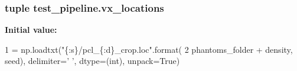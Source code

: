 \hypertarget{namespacetest__pipeline_a0891497d3339772fa64ecb2ef3816a8a}{
\subsubsection[{vx\-\_\-locations}]{\setlength{\rightskip}{0pt plus 5cm}tuple test\-\_\-pipeline.\-vx\-\_\-locations}}\label{namespacetest__pipeline_a0891497d3339772fa64ecb2ef3816a8a}
{\bfseries Initial value\-:}
\begin{DoxyCode}
1 = np.loadtxt(\textcolor{stringliteral}{"\{:s\}/pcl\_\{:d\}\_crop.loc"}.format(
2     phantoms\_folder + density, seed), delimiter=\textcolor{stringliteral}{' '}, dtype=(int), unpack=\textcolor{keyword}{True})
\end{DoxyCode}
